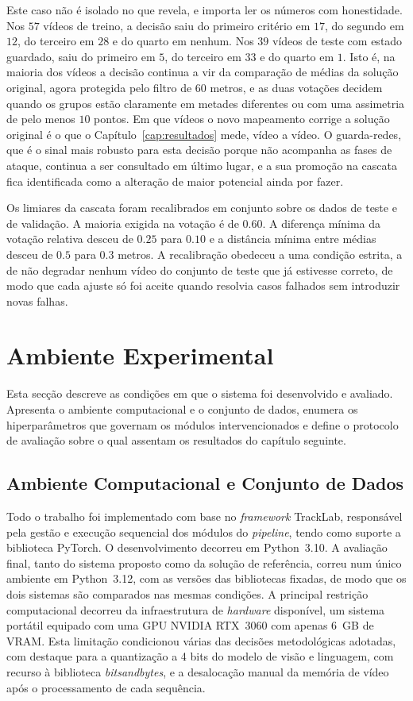 Este caso não é isolado no que revela, e importa ler os números com honestidade. Nos $57$ vídeos
de treino, a decisão saiu do primeiro critério em $17$, do segundo em $12$, do terceiro em $28$ e
do quarto em nenhum. Nos $39$ vídeos de teste com estado guardado, saiu do primeiro em $5$, do
terceiro em $33$ e do quarto em $1$. Isto é, na maioria dos vídeos a decisão continua a vir da
comparação de médias da solução original, agora protegida pelo filtro de $60$ metros, e as duas
votações decidem quando os grupos estão claramente em metades diferentes ou com uma assimetria de
pelo menos $10$ pontos. Em que vídeos o novo mapeamento corrige a solução original é o que o
Capítulo~\ref{cap:resultados} mede, vídeo a vídeo. O guarda-redes, que é o sinal mais robusto para esta
decisão porque não acompanha as fases de ataque, continua a ser consultado em último lugar, e a
sua promoção na cascata fica identificada como a alteração de maior potencial ainda por fazer.

Os limiares da cascata foram recalibrados em conjunto sobre os dados de teste e de validação. A
maioria exigida na votação é de $0.60$. A diferença mínima da votação relativa desceu de $0.25$
para $0.10$ e a distância mínima entre médias desceu de $0.5$ para $0.3$ metros. A recalibração
obedeceu a uma condição estrita, a de não degradar nenhum vídeo do conjunto de teste que já
estivesse correto, de modo que cada ajuste só foi aceite quando resolvia casos falhados sem
introduzir novas falhas.

\FloatBarrier

\section{Ambiente Experimental}

Esta secção descreve as condições em que o sistema foi desenvolvido e avaliado. Apresenta o ambiente
computacional e o conjunto de dados, enumera os hiperparâmetros que governam os módulos
intervencionados e define o protocolo de avaliação sobre o qual assentam os resultados do capítulo
seguinte.

\subsection{Ambiente Computacional e Conjunto de Dados}\label{sec:ambiente}

Todo o trabalho foi implementado com base no \emph{framework} TrackLab, responsável pela gestão e
execução sequencial dos módulos do \emph{pipeline}, tendo como suporte a biblioteca PyTorch. O
desenvolvimento decorreu em Python~3.10. A avaliação final, tanto do sistema proposto como da
solução de referência, correu num único ambiente em Python~3.12, com as versões das bibliotecas
fixadas, de modo que os dois sistemas são comparados nas mesmas condições.
A principal restrição computacional decorreu da infraestrutura de \emph{hardware}
disponível, um sistema portátil equipado com uma GPU NVIDIA RTX~3060 com apenas 6~GB de VRAM. Esta
limitação condicionou várias das decisões metodológicas adotadas, com destaque para a quantização a
4 bits do modelo de visão e linguagem, com recurso à biblioteca \emph{bitsandbytes}, e a desalocação
manual da memória de vídeo após o processamento de cada sequência.

